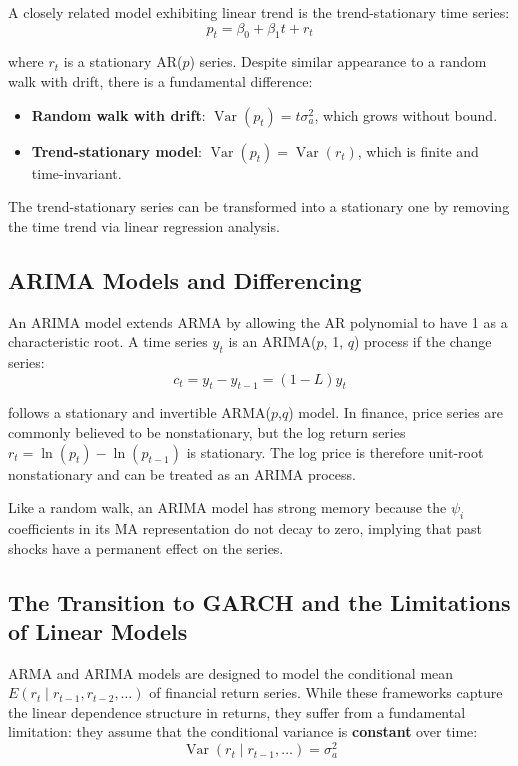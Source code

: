 A closely related model exhibiting linear trend is the trend-stationary time series:
$$p_t = \beta_0 + \beta_1 t + r_t$$

where $r_t$ is a stationary AR($p$) series. Despite similar appearance to a random walk with drift, there is a fundamental difference:
\begin{itemize}
    \item \textbf{Random walk with drift}: $\operatorname{Var}(p_t) = t\sigma_a^2$, which grows without bound.
    \item \textbf{Trend-stationary model}: $\operatorname{Var}(p_t) = \operatorname{Var}(r_t)$, which is finite and time-invariant.
\end{itemize}

The trend-stationary series can be transformed into a stationary one by removing the time trend via linear regression analysis.
\subsection{ARIMA Models and Differencing}

An ARIMA model extends ARMA by allowing the AR polynomial to have 1 as a characteristic root. A time series $y_t$ is an ARIMA($p$, 1, $q$) process if the change series:
$$c_t = y_t - y_{t-1} = (1 - L)y_t$$

follows a stationary and invertible ARMA($p$,$q$) model. In finance, price series are commonly believed to be nonstationary, but the log return series $r_t = \ln(p_t) - \ln(p_{t-1})$ is stationary. The log price is therefore unit-root nonstationary and can be treated as an ARIMA process.

Like a random walk, an ARIMA model has strong memory because the $\psi_i$ coefficients in its MA representation do not decay to zero, implying that past shocks have a permanent effect on the series.
\subsection{The Transition to GARCH and the Limitations of Linear Models}

ARMA and ARIMA models are designed to model the conditional mean $E(r_t \mid r_{t-1}, r_{t-2}, \ldots)$ of financial return series. While these frameworks capture the linear dependence structure in returns, they suffer from a fundamental limitation: they assume that the conditional variance is \textbf{constant} over time:
$$\operatorname{Var}(r_t \mid r_{t-1}, \ldots) = \sigma_a^2$$

